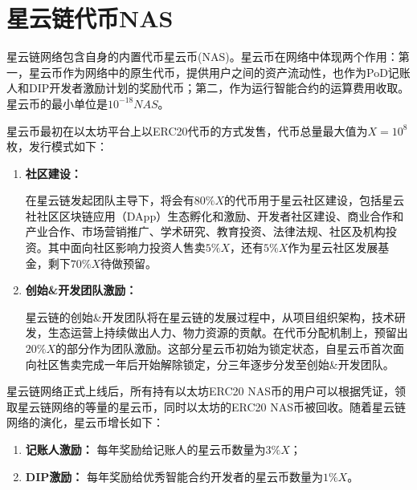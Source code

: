 \section{星云链代币NAS}
\label{sec:nascoin}

星云链网络包含自身的内置代币星云币(NAS)。星云币在网络中体现两个作用：第一，星云币作为网络中的原生代币，提供用户之间的资产流动性，也作为PoD记账人和DIP开发者激励计划的奖励代币；第二，作为运行智能合约的运算费用收取。星云币的最小单位是$10^{-18}NAS$。

星云币最初在以太坊平台上以ERC20代币的方式发售，代币总量最大值为$X=10^8$枚，发行模式如下：
\begin{enumerate}
	\item \textbf{社区建设：}
	
在星云链发起团队主导下，将会有$80\%X$的代币用于星云社区建设，包括星云社社区区块链应用（DApp）生态孵化和激励、开发者社区建设、商业合作和产业合作、市场营销推广、学术研究、教育投资、法律法规、社区及机构投资。其中面向社区影响力投资人售卖$5\%X$，还有$5\%X$作为星云社区发展基金，剩下$70\%X$待做预留。

	\item \textbf{创始\&开发团队激励：}

星云链的创始\&开发团队将在星云链的发展过程中，从项目组织架构，技术研发，生态运营上持续做出人力、物力资源的贡献。在代币分配机制上，预留出$20\%X$的部分作为团队激励。这部分星云币初始为锁定状态，自星云币首次面向社区售卖完成一年后开始解除锁定，分三年逐步分发至创始\&开发团队。
\end{enumerate}

星云链网络正式上线后，所有持有以太坊ERC20 NAS币的用户可以根据凭证，领取星云链网络的等量的星云币，同时以太坊的ERC20 NAS币被回收。随着星云链网络的演化，星云币增长如下：
\begin{enumerate}
	\item \textbf{记账人激励：}
	每年奖励给记账人的星云币数量为$3\%X$；
	
	\item \textbf{DIP激励：}
	每年奖励给优秀智能合约开发者的星云币数量为$1\%X$。
\end{enumerate}